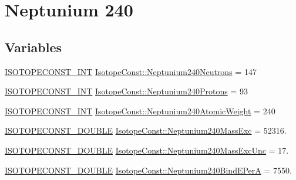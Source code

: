 \hypertarget{group___isotope_const-_neptunium-_np240}{}\section{Neptunium 240}
\label{group___isotope_const-_neptunium-_np240}
\subsection*{Variables}
\begin{DoxyCompactItemize}
\item 
\mbox{\hyperlink{group___isotope_const-_macros_ga5f18360b3e99483a35c32d789e62621c}{I\+S\+O\+T\+O\+P\+E\+C\+O\+N\+S\+T\+\_\+\+I\+NT}} \mbox{\hyperlink{group___isotope_const-_neptunium-_np240_gacc9fec720eb3591f1d86a958cf7a1cb3}{Isotope\+Const\+::\+Neptunium240\+Neutrons}} = 147
\item 
\mbox{\hyperlink{group___isotope_const-_macros_ga5f18360b3e99483a35c32d789e62621c}{I\+S\+O\+T\+O\+P\+E\+C\+O\+N\+S\+T\+\_\+\+I\+NT}} \mbox{\hyperlink{group___isotope_const-_neptunium-_np240_ga18f1bcba6db6a9868fe80373c26e1ce2}{Isotope\+Const\+::\+Neptunium240\+Protons}} = 93
\item 
\mbox{\hyperlink{group___isotope_const-_macros_ga5f18360b3e99483a35c32d789e62621c}{I\+S\+O\+T\+O\+P\+E\+C\+O\+N\+S\+T\+\_\+\+I\+NT}} \mbox{\hyperlink{group___isotope_const-_neptunium-_np240_ga3821a9620485f455f4bb7df58e773d1a}{Isotope\+Const\+::\+Neptunium240\+Atomic\+Weight}} = 240
\item 
\mbox{\hyperlink{group___isotope_const-_macros_ga8f45a7272ce02c0b4c65c44636ed719a}{I\+S\+O\+T\+O\+P\+E\+C\+O\+N\+S\+T\+\_\+\+D\+O\+U\+B\+LE}} \mbox{\hyperlink{group___isotope_const-_neptunium-_np240_ga167c5fbf05bf48a3ebb6503fc49b2ac5}{Isotope\+Const\+::\+Neptunium240\+Mass\+Exc}} = 52316.
\item 
\mbox{\hyperlink{group___isotope_const-_macros_ga8f45a7272ce02c0b4c65c44636ed719a}{I\+S\+O\+T\+O\+P\+E\+C\+O\+N\+S\+T\+\_\+\+D\+O\+U\+B\+LE}} \mbox{\hyperlink{group___isotope_const-_neptunium-_np240_ga83ff6590e44c0d979a3697bf143c4445}{Isotope\+Const\+::\+Neptunium240\+Mass\+Exc\+Unc}} = 17.
\item 
\mbox{\hyperlink{group___isotope_const-_macros_ga8f45a7272ce02c0b4c65c44636ed719a}{I\+S\+O\+T\+O\+P\+E\+C\+O\+N\+S\+T\+\_\+\+D\+O\+U\+B\+LE}} \mbox{\hyperlink{group___isotope_const-_neptunium-_np240_ga987325b04fc0116d76f046cb5f13b9a9}{Isotope\+Const\+::\+Neptunium240\+Bind\+E\+PerA}} = 7550.
\item 

\end{DoxyCompactItemize}
